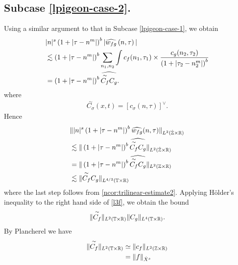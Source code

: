 \subsection{Subcase \eqref{lpigeon-case-2}.}
Using a similar argument to that in Subcase \eqref{lpigeon-case-1}, we obtain
%
%
\begin{equation}
	\label{l1f}
	\begin{split}
		 & |n|^s \left( 1 + | \tau - n^{m } | \right)^{b} | \widehat{w_{fg}}\left( 
		n, \tau \right) |
		\\
		& \lesssim \left( 1 + | \tau - n^{m } | \right)^{b}
		\sum_{n_1, n_2} \int
		c_f(n_1, \tau_1)
		\times
		\frac{c_g(n_2, \tau_2)}{\left( 1 + | \tau_2 - n_2^{m } | 
		\right)^{b}} 
		\\
		& = \left( 1 + | \tau - n^{m } | \right)^{b} \widehat{\overset{\sim}{C_f} C_g}.
	\end{split}
\end{equation}
%
where
%
%
\begin{equation*}
	\begin{split}
		\overset{\sim}{C_\sigma}(x,t) = \left[ c_\sigma(n, \tau) \right]^\vee.
	\end{split}
\end{equation*}
%
%
Hence
%
\begin{equation}
	\label{l3f}
	\begin{split}
		& \| |n|^s \left( 1 + | \tau - n^{m } | \right)^{b} \widehat{w_{fg}}(n, \tau) 
		\|_{L^2(\dot{\mathbb{Z}} \times \mathbb{R})}
		\\
		& \lesssim \|\left( 1 + | \tau - n^{m} | \right)^{b} 
		\widehat{\overset{\sim}{C_f} C_g } \|_{L^2(\dot{\mathbb{Z}} \times \mathbb{R})}
		\\
		& =  \|\left( 1 + | \tau - n^{m} | \right)^{b} 
		\widehat{\overset{\sim}{C_f} C_g } \|_{L^2(\mathbb{Z} \times \mathbb{R})}
		\\
		& \lesssim  \|\overset{\sim}{C_f} C_g  \|_{L^{4/3}(\mathbb{T} \times \mathbb{R})}
	\end{split}
\end{equation}
%
where the last step follows from \cref{ncor:trilinear-estimate2}. Applying
H\"{o}lder's inequality to the right hand side of \eqref{l3f}, we obtain the
bound
%
\begin{equation}
	\label{l4f}
	\begin{split}
		\|\overset{\sim}{C_f} \|_{L^2(\mathbb{T} \times \mathbb{R})} \|C_g \|_{L^4\left( \mathbb{T} 
		\times \mathbb{R} 
		\right)}. 
	\end{split}
\end{equation}
%
By Plancherel we have
%
%
\begin{equation}
	\label{l5f}
	\begin{split}
		\|\overset{\sim}{C_f} \|_{L^2(\mathbb{T} \times \mathbb{R})}
		& \simeq \|c_f\|_{L^2(\mathbb{Z} \times \mathbb{R})}
		\\
		& = \|f \|_{\dot{X}^s}
	\end{split}
\end{equation}
